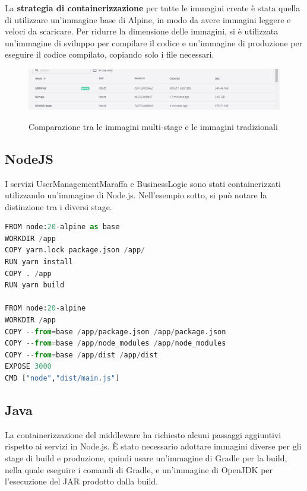 La \textbf{strategia di containerizzazione} per tutte le immagini create è stata quella di utilizzare un'immagine base di Alpine, in modo da avere immagini leggere e veloci da scaricare. Per ridurre la dimensione delle immagini,
si è utilizzata un'immagine di sviluppo per compilare il codice e un'immagine di produzione per eseguire il codice compilato, copiando solo i file necessari.

\begin{figure}[H]
\caption{Comparazione tra le immagini multi-stage e le immagini tradizionali}
\centering
\includegraphics[width=12cm]{report/img/multi_stage.png}\\[4.5cm]
\end{figure}

\subsection{NodeJS}

I servizi UserManagementMaraffa e BusinessLogic sono stati containerizzati utilizzando un'immagine di Node.js. Nell'esempio sotto, si può notare la distinzione tra i diversi stage.
\vspace{1cm}

\begin{lstlisting}[language=Python, caption={Dockerfile delle immagini NodeJS}, label=list:dockerfile_nodejs]
FROM node:20-alpine as base
WORKDIR /app
COPY yarn.lock package.json /app/
RUN yarn install
COPY . /app
RUN yarn build

FROM node:20-alpine
WORKDIR /app    
COPY --from=base /app/package.json /app/package.json
COPY --from=base /app/node_modules /app/node_modules
COPY --from=base /app/dist /app/dist
EXPOSE 3000
CMD ["node","dist/main.js"]
\end{lstlisting}

\subsection{Java}

La containerizzazione del middleware ha richiesto alcuni passaggi aggiuntivi rispetto ai servizi in Node.js.
È stato necessario adottare immagini diverse per gli stage di build e produzione, quindi usare un'immagine di Gradle per la build, nella quale eseguire i comandi di Gradle, e un'immagine di 
OpenJDK per l'esecuzione del JAR prodotto dalla build.

